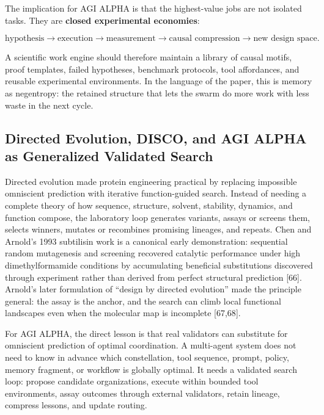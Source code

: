 \documentclass[11pt]{article}
\begin{document}
The implication for AGI ALPHA is that the highest-value jobs are not isolated tasks. They are \textbf{closed experimental economies}:

\[
\text{hypothesis}
\rightarrow
\text{execution}
\rightarrow
\text{measurement}
\rightarrow
\text{causal compression}
\rightarrow
\text{new design space}.
\]

A scientific work engine should therefore maintain a library of causal motifs, proof templates, failed hypotheses, benchmark protocols, tool affordances, and reusable experimental environments. In the language of the paper, this is memory as negentropy: the retained structure that lets the swarm do more work with less waste in the next cycle.

\subsection{Directed Evolution, DISCO, and AGI ALPHA as Generalized Validated Search}\label{directed-evolution-disco-and-agi-alpha-as-generalized-validated-search}

Directed evolution made protein engineering practical by replacing impossible omniscient prediction with iterative function-guided search. Instead of needing a complete theory of how sequence, structure, solvent, stability, dynamics, and function compose, the laboratory loop generates variants, assays or screens them, selects winners, mutates or recombines promising lineages, and repeats. Chen and Arnold's 1993 subtilisin work is a canonical early demonstration: sequential random mutagenesis and screening recovered catalytic performance under high dimethylformamide conditions by accumulating beneficial substitutions discovered through experiment rather than derived from perfect structural prediction {[}66{]}. Arnold's later formulation of ``design by directed evolution'' made the principle general: the assay is the anchor, and the search can climb local functional landscapes even when the molecular map is incomplete {[}67,68{]}.

For AGI ALPHA, the direct lesson is that real validators can substitute for omniscient prediction of optimal coordination. A multi-agent system does not need to know in advance which constellation, tool sequence, prompt, policy, memory fragment, or workflow is globally optimal. It needs a validated search loop: propose candidate organizations, execute within bounded tool environments, assay outcomes through external validators, retain lineage, compress lessons, and update routing.
\end{document}
